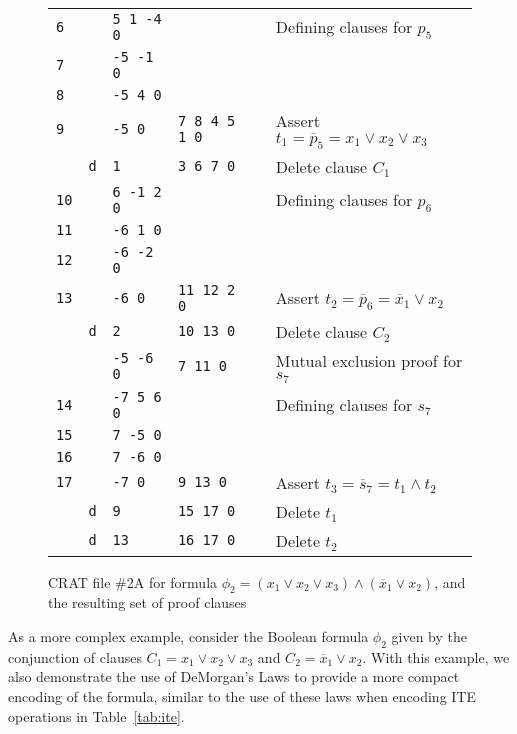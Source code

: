 \documentclass{llncs}
\newcommand{\obar}[1]{\overline{#1}}
\begin{document}
\begin{figure}
\begin{center}
\begin{tabular}{lcllll}
    {\tt 6} &   & {\tt 5 1 -4 0} &    & & Defining clauses for $p_5$ \\
    {\tt 7} &   & {\tt -5 -1 0} &     & & \\
    {\tt 8} &   & {\tt -5 4 0} &      & & \\

    {\tt 9} &   & {\tt -5 0} & {\tt 7 8 4 5 1 0} & & Assert $t_1 = \obar{p}_5 = x_1 \lor x_2 \lor x_3$ \\
            & {\tt d}  & {\tt 1 } & {\tt 3 6 7 0} & & Delete clause $C_1$\\

    {\tt 10} &   & {\tt 6 -1 2 0}  &    & & Defining clauses for $p_6$ \\ 
    {\tt 11} &   & {\tt -6 1 0}    &  & & \\
    {\tt 12} &   & {\tt -6 -2 0}    &  & & \\ 
    {\tt 13} &  & {\tt -6 0} & {\tt 11 12 2 0}  & & Assert $t_2 = \obar{p}_6 = \obar{x}_1 \lor x_2$ \\
            & {\tt d}  & {\tt 2 } & {\tt 10 13 0} & & Delete clause $C_2$\\
             &          & {\tt -5 -6 0} & {\tt 7 11 0}  & & Mutual exclusion proof for $s_7$ \\
    {\tt 14} &   & {\tt -7 5 6 0}  &     & & Defining clauses for $s_7$ \\ 
    {\tt 15} &   & {\tt  7 -5 0}    &  &  \\  
    {\tt 16} &   & {\tt  7 -6 0}    &  & &  \\
    {\tt 17} &   & {\tt -7 0}       & {\tt 9 13 0} & & Assert $t_3 = \obar{s}_7 = t_1 \land t_2$ \\
             & {\tt d}  & {\tt 9}          & {\tt 15 17 0} & & Delete $t_1$\\
             & {\tt d}  & {\tt 13}         & {\tt 16 17 0} & & Delete $t_2$\\
  \end{tabular}
  \end{center}  
  \caption{CRAT file \#2A for formula $\phi_2 = (x_1 \lor x_2 \lor x_3) \land (\obar{x}_1 \lor x_2)$, and the resulting set of proof clauses}
  \label{fig:p2-bdd:crat}
\end{figure}

As a more complex example, consider the Boolean formula $\phi_2$ given
by the conjunction of clauses $C_1 = x_1 \lor x_2 \lor x_3$ and $C_2 =
\obar{x}_1 \lor x_2$.  With this example, we also demonstrate the use
of DeMorgan's Laws to provide a more compact encoding of the formula,
similar to the use of these laws when encoding ITE operations in
Table~\ref{tab:ite}.
\end{document}
